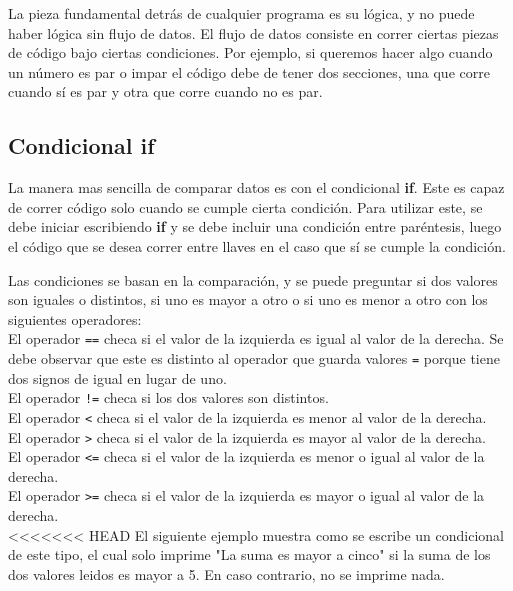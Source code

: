 \documentclass{article}
\begin{document}
La pieza fundamental detrás de cualquier programa es su lógica, y no puede haber lógica sin flujo de datos. El flujo de datos consiste en correr ciertas piezas de código bajo ciertas condiciones. Por ejemplo, si queremos hacer algo cuando un número es par o impar el código debe de tener dos secciones, una que corre cuando sí es par y otra que corre cuando no es par.

\subsection{Condicional if}

La manera mas sencilla de comparar datos es con el condicional \textbf{if}. Este es capaz de correr código solo cuando se cumple cierta condición. Para utilizar este, se debe iniciar escribiendo \textbf{if} y se debe incluir una condición entre paréntesis, luego el código que se desea correr entre llaves en el caso que sí se cumple la condición.

Las condiciones se basan en la comparación, y se puede preguntar si dos valores son iguales o distintos, si uno es mayor a otro o si uno es menor a otro con los siguientes operadores: \\

El operador \lstinline{==} checa si el valor de la izquierda es igual al valor de la derecha. Se debe observar que este es distinto al operador que guarda valores \lstinline{=} porque tiene dos signos de igual en lugar de uno. \\

El operador \lstinline{!=} checa si los dos valores son distintos. \\

El operador \lstinline{<} checa si el valor de la izquierda es menor al valor de la derecha. \\

El operador \lstinline{>} checa si el valor de la izquierda es mayor al valor de la derecha. \\

El operador \lstinline{<=} checa si el valor de la izquierda es menor o igual al valor de la  derecha. \\

El operador \lstinline{>=} checa si el valor de la izquierda es mayor o igual al valor de la derecha. \\

<<<<<<< HEAD
El siguiente ejemplo muestra como se escribe un condicional de este tipo, el cual solo imprime "La suma es mayor a cinco" si la suma de los dos valores leidos es mayor a 5. En caso contrario, no se imprime nada.
\end{document}
